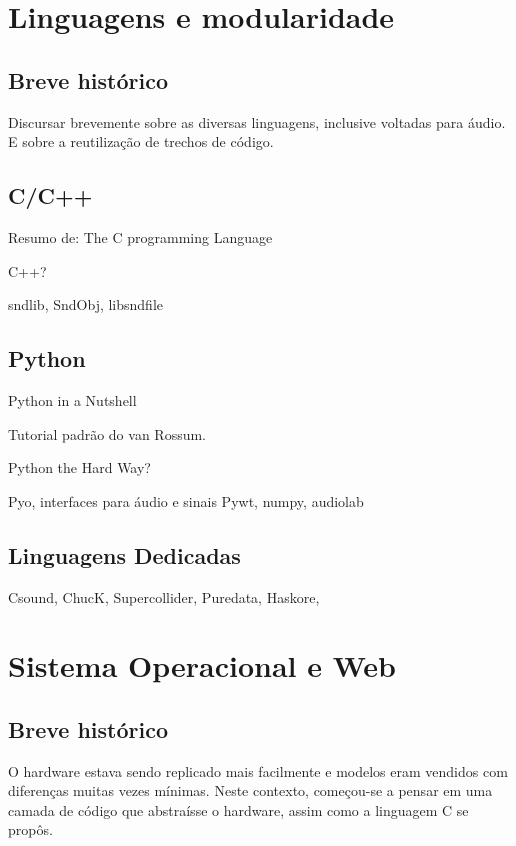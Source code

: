 \section{Linguagens e modularidade}

\subsection{Breve histórico}

Discursar brevemente sobre as diversas linguagens,
inclusive voltadas para áudio. E sobre a reutilização
de trechos de código.

\subsection{C/C++}

Resumo de:
The C programming Language

C++?

sndlib, SndObj, libsndfile

\subsection{Python}

Python in a Nutshell

Tutorial padrão do van Rossum.

Python the Hard Way?

Pyo, interfaces para áudio e sinais Pywt, numpy, audiolab

\subsection{Linguagens Dedicadas}

Csound, ChucK, Supercollider, Puredata, Haskore, 

\section{Sistema Operacional e Web}

\subsection{Breve histórico}

O hardware estava sendo replicado mais facilmente e
modelos eram vendidos com diferenças
muitas vezes mínimas. Neste contexto, começou-se a
pensar em uma camada de código que abstraísse o hardware, assim
como a linguagem C se propôs.

